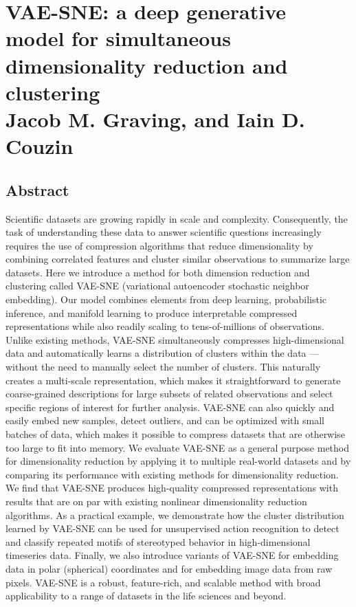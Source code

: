 	\chapter[VAE-SNE]{VAE-SNE: a deep generative model for simultaneous dimensionality reduction and clustering  \\ \vspace{10mm} \Large Jacob M. Graving, and Iain D. Couzin}
\newpage
\normalsize
\section{Abstract}
Scientific datasets are growing rapidly in scale and complexity. Consequently, the task of understanding these data to answer scientific questions increasingly requires the use of compression algorithms that
reduce dimensionality by combining correlated features and cluster similar observations to summarize
large datasets. Here we introduce a method for both dimension reduction and clustering called
VAE-SNE (variational autoencoder stochastic neighbor embedding). Our model combines elements from
deep learning, probabilistic inference, and manifold learning to produce interpretable compressed
representations while also readily scaling to tens-of-millions of observations. Unlike existing methods,
VAE-SNE simultaneously compresses high-dimensional data and automatically learns a distribution of
clusters within the data — without the need to manually select the number of clusters. This naturally
creates a multi-scale representation, which makes it straightforward to generate coarse-grained
descriptions for large subsets of related observations and select specific regions of interest for further
analysis. VAE-SNE can also quickly and easily embed new samples, detect outliers, and can be optimized
with small batches of data, which makes it possible to compress datasets that are otherwise too large to
fit into memory. We evaluate VAE-SNE as a general purpose method for dimensionality reduction by
applying it to multiple real-world datasets and by comparing its performance with existing methods for
dimensionality reduction. We find that VAE-SNE produces high-quality compressed representations with
results that are on par with existing nonlinear dimensionality reduction algorithms. As a practical
example, we demonstrate how the cluster distribution learned by VAE-SNE can be used for unsupervised
action recognition to detect and classify repeated motifs of stereotyped behavior in high-dimensional
timeseries data. Finally, we also introduce variants of VAE-SNE for embedding data in polar (spherical)
coordinates and for embedding image data from raw pixels. VAE-SNE is a robust, feature-rich, and
scalable method with broad applicability to a range of datasets in the life sciences and beyond.

